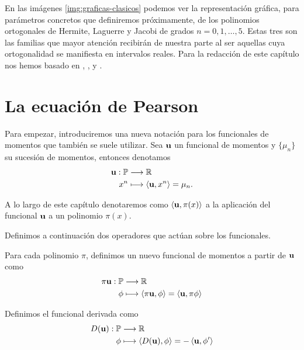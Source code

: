 En las imágenes \ref{img:graficas-clasicos} podemos ver la representación gráfica, para parámetros concretos que definiremos próximamente, de los polinomios ortogonales de Hermite, Laguerre y Jacobi de grados $n=0,1,\dots,5$. Estas tres son las familias que mayor atención recibirán de nuestra parte al ser aquellas cuya ortogonalidad se manifiesta en intervalos reales. Para la redacción de este capítulo nos hemos basado en \cite{Marcellán1994}, \cite[Ch. III]{renato}, \cite[Ch. XII, Section 12.1]{ARFKEN2013551} y \cite[Ch. I, Section 1.4]{dunkl-2014}.

\section{La ecuación de Pearson}

Para empezar, introduciremos una nueva notación para los funcionales de momentos que también se suele utilizar. Sea $\mathbf{u}$ un funcional de momentos y $\{\mu_n\}$ su sucesión de momentos, entonces denotamos
\begin{equation}
    \label{eq:nueva-notacion-funcional}
    \begin{split}
        \mathbf{u}:\mathbb P & \longrightarrow \mathbb{R} \\
        x^n & \longmapsto \left\langle \mathbf{u}, x^n \right\rangle = \mu_n.
    \end{split}
\end{equation}

A lo largo de este capítulo denotaremos como $\left\langle \mathbf{u} , \pi(x) \right\rangle$ a la aplicación del funcional $\mathbf{u}$ a un polinomio $\pi(x)$.

Definimos a continuación dos operadores que actúan sobre los funcionales.

\begin{definicion}
    Para cada polinomio $\pi$, definimos un nuevo funcional de momentos a partir de $\mathbf{u}$ como
    \begin{equation}
        \begin{split}
            \pi\mathbf{u}:\mathbb P & \longrightarrow \mathbb{R} \\
            \phi & \longmapsto \left\langle \pi\mathbf{u} , \phi \right\rangle=\left\langle \mathbf{u} , \pi\phi \right\rangle
        \end{split}
    \end{equation}
    
\end{definicion}

\begin{definicion}[Derivada]
    Definimos el funcional derivada como
    \begin{equation}
        \begin{split}
            D(\mathbf{u}):\mathbb P & \longrightarrow \mathbb{R} \\
            \phi & \longmapsto \left\langle D(\mathbf{u}) , \phi \right\rangle=-\left\langle \mathbf{u} , \phi' \right\rangle
        \end{split}
    \end{equation}
    
\end{definicion}

